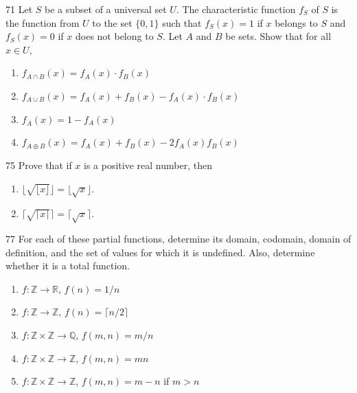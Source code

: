 \documentclass[11pt]{article}
\begin{document}
\begin{exercise}{71}
    Let $S$ be a subset of a universal set $U$. The characteristic
    function $f_S$ of $S$ is the function from $U$ to the set $\{0, 1\}$
    such that $f_S(x) = 1$ if $x$ belongs to $S$ and $f_S(x) = 0$ if $x$
    does not belong to $S$. Let $A$ and $B$ be sets. Show that for all
    $x \in U$,
    \begin{enumerate}[label=(\alph*)]
        \item $f_{A \cap B}(x) = f_A(x) \cdot f_B(x)$
        \item $f_{A \cup B}(x) = f_A(x) + f_B(x) - f_A(x) \cdot f_B(x)$
        \item $f_{\overline{A}}(x) = 1 - f_A(x)$
        \item $f_{A \oplus B}(x) = f_A(x) + f_B(x) - 2 f_A(x) f_B(x)$
    \end{enumerate}
\end{exercise}

\begin{exercise}{75}
    Prove that if $x$ is a positive real number, then
    \begin{enumerate}[label=(\alph*)]
        \item $\lfloor\sqrt{\lfloor x \rfloor}\rfloor = \lfloor\sqrt{x}\rfloor$.
        \item $\lceil\sqrt{\lceil x \rceil}\rceil = \lceil\sqrt{x}\rceil$.
    \end{enumerate}
\end{exercise}

\begin{exercise}{77}
    For each of these partial functions, determine its domain,
    codomain, domain of definition, and the set of values for which it
    is undefined. Also, determine whether it is a total function.
    \begin{enumerate}[label=(\alph*)]
        \item $f : \mathbb{Z} \to \mathbb{R}$, $f(n) = 1/n$
        \item $f : \mathbb{Z} \to \mathbb{Z}$, $f(n) = \lceil n/2 \rceil$
        \item $f : \mathbb{Z} \times \mathbb{Z} \to \mathbb{Q}$,
        $f(m, n) = m/n$
        \item $f : \mathbb{Z} \times \mathbb{Z} \to \mathbb{Z}$,
        $f(m, n) = mn$
        \item $f : \mathbb{Z} \times \mathbb{Z} \to \mathbb{Z}$,
        $f(m, n) = m - n$ if $m > n$
    \end{enumerate}
\end{exercise}
\end{document}
